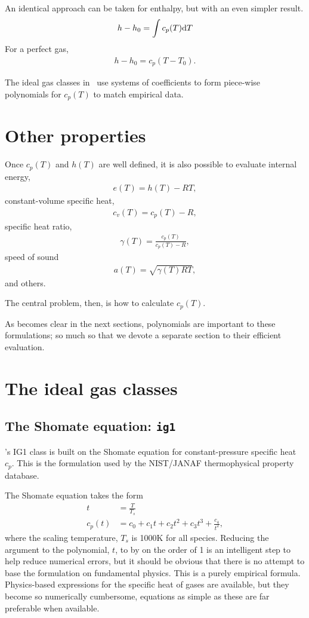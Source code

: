 An identical approach can be taken for enthalpy, but with an even simpler result.  
\begin{align}
h - h_0 = \int c_p(T) \mathrm{d} T
\end{align}
For a perfect gas,
\begin{align}
h - h_0 = c_p \left(T - T_0\right).
\end{align}

The ideal gas classes in \PM\ use systems of coefficients to form piece-wise polynomials for $c_p(T)$ to match empirical data.

\section{Other properties}

Once $c_p(T)$ and $h(T)$ are well defined, it is also possible to evaluate internal energy,
\begin{align}
e(T) = h(T) - RT,
\end{align}
constant-volume specific heat,
\begin{align}
c_v(T) = c_p(T) - R,
\end{align}
specific heat ratio,
\begin{align}
\gamma(T) = \frac{c_p(T)}{c_p(T) - R},
\end{align}
speed of sound
\begin{align}
a(T) = \sqrt{\gamma(T) R T},
\end{align}
and others.

The central problem, then, is how to calculate $c_p(T)$.

As becomes clear in the next sections, polynomials are important to these formulations; so much so that we devote a separate section to their efficient evaluation.

\section{The ideal gas classes}

\subsection{The Shomate equation: \texttt{ig1}}

\PM's IG1 class is built on the Shomate equation for constant-pressure specific heat $c_p$.  This is the formulation used by the NIST/JANAF thermophysical property database.

The Shomate equation takes the form
\begin{align}
t &= \frac{T}{T_s}\\
c_p(t) &= c_0 + c_1 t + c_2 t^2 + c_3 t^3 + \frac{c_4}{t^2},
\end{align}
where the scaling temperature, $T_s$ is 1000K for all species.  Reducing the argument to the polynomial, $t$, to by on the order of 1 is an intelligent step to help reduce numerical errors, but it should be obvious that there is no attempt to base the formulation on fundamental physics.  This is a purely empirical formula.  Physics-based expressions for the specific heat of gases are available, but they become so numerically cumbersome, equations as simple as these are far preferable when available.


